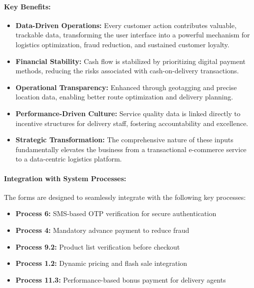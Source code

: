 \documentclass[12pt,a4paper]{article}
\begin{document}
\paragraph{Key Benefits:}
\begin{itemize}
    \item \textbf{Data-Driven Operations:} Every customer action contributes valuable, trackable data, transforming the user interface into a powerful mechanism for logistics optimization, fraud reduction, and sustained customer loyalty.
    
    \item \textbf{Financial Stability:} Cash flow is stabilized by prioritizing digital payment methods, reducing the risks associated with cash-on-delivery transactions.
    
    \item \textbf{Operational Transparency:} Enhanced through geotagging and precise location data, enabling better route optimization and delivery planning.
    
    \item \textbf{Performance-Driven Culture:} Service quality data is linked directly to incentive structures for delivery staff, fostering accountability and excellence.
    
    \item \textbf{Strategic Transformation:} The comprehensive nature of these inputs fundamentally elevates the business from a transactional e-commerce service to a data-centric logistics platform.
\end{itemize}

\paragraph{Integration with System Processes:}
The forms are designed to seamlessly integrate with the following key processes:
\begin{itemize}
    \item \textbf{Process 6:} SMS-based OTP verification for secure authentication
    \item \textbf{Process 4:} Mandatory advance payment to reduce fraud
    \item \textbf{Process 9.2:} Product list verification before checkout
    \item \textbf{Process 1.2:} Dynamic pricing and flash sale integration
    \item \textbf{Process 11.3:} Performance-based bonus payment for delivery agents
\end{itemize}
\end{document}
